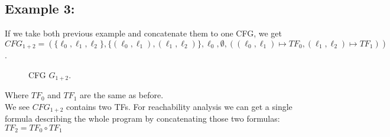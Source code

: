\documentclass{article}
\begin{document}
	
	\subsection*{Example 3:}
	If we take both previous example and concatenate them to one CFG, we get \\ $CFG_{1+2} = (\{ \ell_0, \ell_1, \ell_2\}, \{ (\ell_0, \ell_1), (\ell_1, \ell_2)\}, \ell_0, \emptyset, ((\ell_0, \ell_1) \mapsto TF_0, (\ell_1, \ell_2) \mapsto TF_1))$.
		\begin{figure}[H]
		\centering
		\caption{CFG $G_{1 + 2}$.}
	\end{figure}
	Where $TF_0$ and $TF_1$ are the same as before. \\
	We see $CFG_{1+2}$ contains two TFs. For reachability analysis we can get a single formula describing the whole program by concatenating those two formulas:
	$TF_2 = TF_0 \circ TF_1$ \\
	
\end{document}
